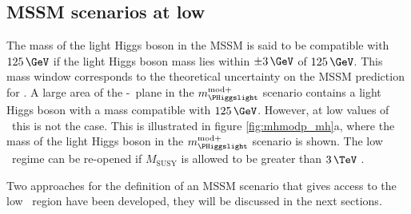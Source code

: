 \subsection{MSSM scenarios at low \tanb}
\label{sec:mssm_theory_lowtb}
The mass of the light Higgs boson in the \ac{MSSM} is said to
be compatible with $125\,\GeV$ if the light Higgs boson mass lies within 
$\pm 3\,\GeV$ of $125\,\GeV$. This mass window
corresponds to the theoretical uncertainty on the \ac{MSSM} prediction for \mh.
A large area of the \mbox{\mA-\tanb}~plane in the $m_{\PHiggslight}^{\text{mod+}}$ 
scenario contains a light Higgs boson with a mass compatible with
$125\,\GeV$. However, at low values of \tanb~this is not the case.
This is illustrated in figure \ref{fig:mhmodp_mh}a, where the mass of the light Higgs
boson in the $m_{\PHiggslight}^{\text{mod}+}$ scenario is shown.
The low \tanb~regime can be re-opened
if $M_{\text{SUSY}}$ is allowed to be greater than $3\,\TeV$ \cite{MSSM-reopen}. 
%

Two approaches for the definition of an \ac{MSSM} scenario that gives
access to the low \tanb~region have been developed, they will be
discussed in the next sections.

